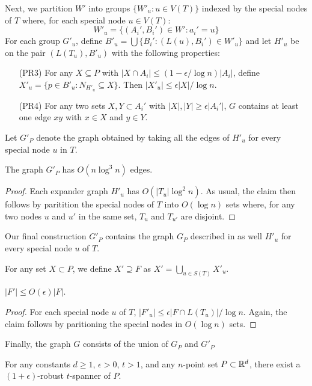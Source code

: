 \documentclass{patmorin}
\begin{document}
Next, we partition $W'$ into groups $\{W'_u: u\in V(T)\}$ indexed by
the special nodes of $T$ where, for each special node $u\in V(T)$:
\[
	W'_u = \{ (A_i',B_i')\in W' : a_i' = u \}
\]
For each group $G'_u$, define $B'_u=\bigcup\{B_i' : (L(u),B_i')\in
W'_u\}$ and let $H'_u$ be on the pair $(L(T_u), B'_u)$ with the following
properties: 
\begin{enumerate}
  \item[(PR3)] For any $X\subseteq P$ with $|X\cap A_i|\le
  (1-\epsilon/\log n)|A_i|$, define $X'_u = \{p\in B'_u: N_{H'_u}\subseteq
  X\}$.  Then $|X'_u|\le \epsilon|X|/\log n$.

  \item[(PR4)] For any two sets $X,Y\subset A_i'$ with $|X|,|Y|\ge
  \epsilon|A_i'|$, $G$ contains at least one edge $xy$ with $x\in X$
  and $y\in Y$.
\end{enumerate}

Let $G'_P$ denote the graph obtained by taking all the edges of $H'_u$ for every special node $u$ in $T$.

\begin{clm}
  The graph $G'_P$ has $O(n\log^3 n)$ edges.
\end{clm}

\begin{proof}
  Each expander graph $H'_u$ has $O(|T_u|\log^2 n)$.  As usual, the claim
  then follows by paritition the special nodes of $T$ into $O(\log n)$
  sets where, for any two nodes $u$ and $u'$ in the same set, $T_u$ and
  $T_{u'}$ are disjoint.
\end{proof}

Our final construction $G'_P$ contains the graph $G_P$ described in
 as well $H'_u$ for every special node $u$ of $T$.

For any set $X\subset P$, we define $X'\supseteq F$ as 
$X' = \bigcup_{u\in S(T)} X'_u$.

\begin{clm}
  $|F'| \le O(\epsilon)|F|$.
\end{clm}

\begin{proof}
  For each special node $u$ of $T$, $|F'_u|\le \epsilon|F\cap L(T_u)|/\log
  n$.  Again, the claim follows by paritioning the special nodes in
  $O(\log n)$ sets.
\end{proof}

Finally, the graph $G$ consists of the union of $G_P$ and $G'_P$


\begin{clm}
  For any constants $d\ge 1$, $\epsilon >0$, $t>1$, and any $n$-point set
  $P\subset\mathbb{R}^d$, there exist a $(1+\epsilon)$-robust $t$-spanner of $P$.
\end{clm}
\end{document}

